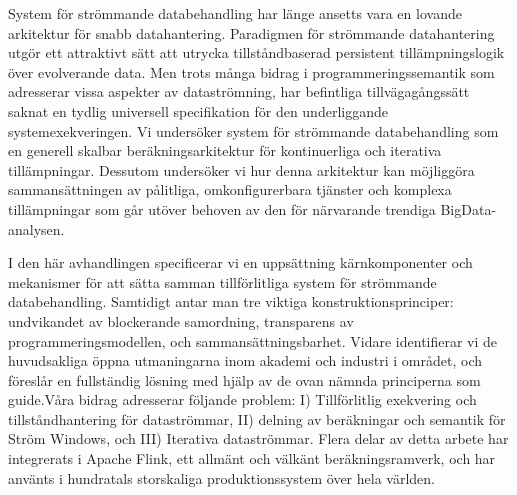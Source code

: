 
\begin{sammanfattning}

System f\"or str\"ommande databehandling har l\"{a}nge ansetts vara en lovande arkitektur f\"{o}r snabb datahantering. Paradigmen f\"{o}r str\"{o}mmande datahantering utg\"{o}r ett attraktivt s\"{a}tt att utrycka tillst{\aa}ndbaserad persistent till\"{a}mpningslogik \"{o}ver evolverande data. Men trots m{\aa}nga bidrag i programmeringssemantik som adresserar vissa aspekter av datastr\"{o}mning, har befintliga tillv\"{a}gag{\aa}ngss\"{a}tt saknat en tydlig universell specifikation f\"{o}r den underliggande systemexekveringen. Vi unders\"{o}ker system f\"or str\"ommande databehandling som en generell skalbar ber\"{a}kningsarkitektur f\"{o}r kontinuerliga och iterativa till\"{a}mpningar. Dessutom unders\"{o}ker vi hur denna arkitektur kan m\"{o}jligg\"{o}ra sammans\"{a}ttningen av p{\aa}litliga, omkonfigurerbara tj\"{a}nster och komplexa till\"{a}mpningar som g{\aa}r ut\"{o}ver behoven av den f\"{o}r n\"{a}rvarande trendiga BigData-analysen.

I den h\"{a}r avhandlingen specificerar vi en upps\"{a}ttning k\"{a}rnkomponenter och mekanismer f\"{o}r att s\"{a}tta samman tillf\"{o}rlitliga system f\"or str\"ommande databehandling. Samtidigt antar man tre viktiga konstruktionsprinciper: undvikandet av blockerande samordning, transparens av programmeringsmodellen, och sammans\"{a}ttningsbarhet. Vidare identifierar vi de huvudsakliga \"{o}ppna utmaningarna inom akademi och industri i omr{\aa}det, och f\"{o}resl{\aa}r en fullst\"{a}ndig l\"{o}sning med hj\"{a}lp av de ovan n\"{a}mnda principerna som guide.V{\aa}ra bidrag adresserar f\"{o}ljande problem: I) Tillf\"{o}rlitlig exekvering och tillst{\aa}ndhantering f\"{o}r datastr\"{o}mmar, II) delning av ber\"{a}kningar och semantik f\"{o}r Str\"{o}m Windows, och III) Iterativa datastr\"{o}mmar. Flera delar av detta arbete har integrerats i Apache Flink, ett allm\"{a}nt och v\"{a}lk\"{a}nt ber\"{a}kningsramverk, och har anv\"{a}nts i hundratals storskaliga produktionssystem \"{o}ver hela v\"{a}rlden.
\end{sammanfattning}


